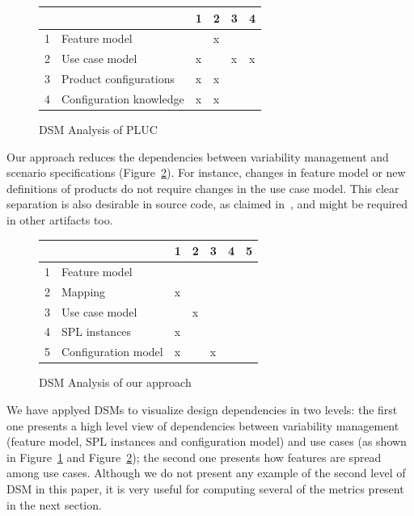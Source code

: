 \documentclass[times, 11pt,twocolumn]{article}
\begin{document}
\begin{figure}[htb]
\centering
\begin{small}
\begin{tabular}{llllll} \hline
&  & 1 & 2 & 3 & 4 \\ \hline
1 & Feature model 			& 	& x	& 	&   	\\ 
2 & Use case model 		& x 	&  	&  x	&  x  \\ 
3 & Product configurations	& x 	& x	& 	&    	\\
4 & Configuration knowledge 	& x 	& x 	& 	&    	\\ \hline
\end{tabular}
\end{small}
 \caption{DSM Analysis of PLUC}
\label{dsm:pluc}
\end{figure}

Our approach reduces the dependencies between variability management and scenario
specifications (Figure~\ref{dsm:cc}). For instance, changes in feature model or
new definitions of products do not require changes in the use case model. This
clear separation is also desirable in source code, as claimed
in~\cite{Alves:2006aa, Apel:2006aa}, and might be required in other artifacts
too. 

\begin{figure}[h]
\centering
\begin{small}
\begin{tabular}{lllllll} \hline
& & 1 & 2 & 3 & 4 & 5 \\ \hline
1 & Feature model 		& 	& 	&      &  	&  	\\ 
2 & Mapping	 		& x	&	&	&	&  	\\
3 & Use case model 	&  	&  x	&  	&  	& 	\\
4 & SPL instances 		& x 	& 	& 	&   	& 	\\
5 & Configuration model 	& x 	&  	&  x	&  	& 	\\  \hline
\end{tabular}
\end{small}
 \caption{DSM Analysis of our approach}
\label{dsm:cc}
\end{figure}   

We have applyed DSMs to visualize design dependencies in two levels: the first
one presents a high level view of dependencies between variability management
(feature model, SPL instances and configuration model) and use cases (as shown in
Figure~\ref{dsm:pluc} and Figure~\ref{dsm:cc}); the second one presents how
features are spread among use cases. Although we do not present any example of
the second level of DSM in this paper, it is very useful for computing several
of the metrics present in the next section.
\end{document}
